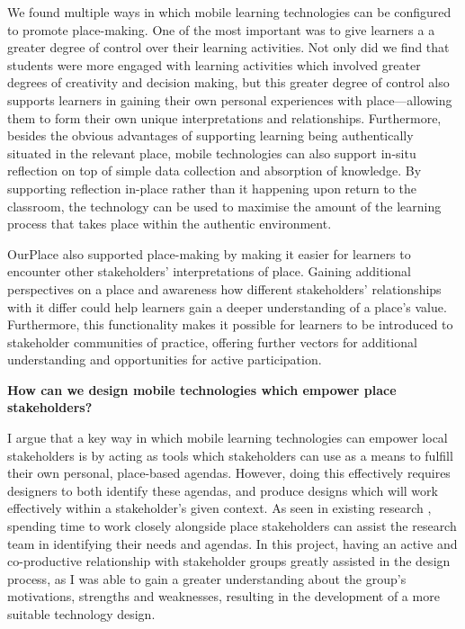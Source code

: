 We found multiple ways in which mobile learning technologies can be configured to promote place-making. One of the most important was to give learners a a greater degree of control over their learning activities. Not only did we find that students were more engaged with learning activities which involved greater degrees of creativity and decision making, but this greater degree of control also supports learners in gaining their own personal experiences with place---allowing them to form their own unique interpretations and relationships. Furthermore, besides the obvious advantages of supporting learning being authentically situated in the relevant place, mobile technologies can also support in-situ reflection on top of simple data collection and absorption of knowledge. By supporting reflection in-place rather than it happening upon return to the classroom, the technology can be used to maximise the amount of the learning process that takes place within the authentic environment.

OurPlace also supported place-making by making it easier for learners to encounter other stakeholders' interpretations of place. Gaining additional perspectives on a place and awareness how different stakeholders' relationships with it differ could help learners gain a deeper understanding of a place's value. Furthermore, this functionality makes it possible for learners to be introduced to stakeholder communities of practice, offering further vectors for additional understanding and opportunities for active participation.

\begin{displayquote}
\textbf{How can we design mobile technologies which empower place stakeholders?}
\end{displayquote}

I argue that a key way in which mobile learning technologies can empower local stakeholders is by acting as tools which stakeholders can use as a means to fulfill their own personal, place-based agendas. However, doing this effectively requires designers to both identify these agendas, and produce designs which will work effectively within a stakeholder's given context. As seen in existing research \citep{Fox2014, Crivellaro2016}, spending time to work closely alongside place stakeholders can assist the research team in identifying their needs and agendas. In this project, having an active and co-productive relationship with stakeholder groups greatly assisted in the design process, as I was able to gain a greater understanding about the group's motivations, strengths and weaknesses, resulting in the development of a more suitable technology design. 

